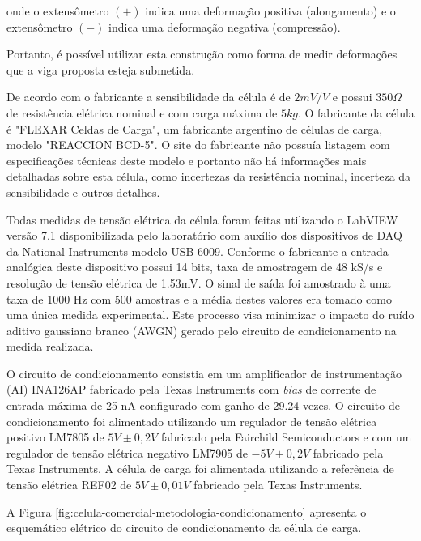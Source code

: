 \documentclass[a4paper]{instrumentacao}
\begin{document}
\noindent onde o extensômetro $(+)$ indica uma deformação positiva (alongamento) e o extensômetro $(-)$ indica uma deformação negativa (compressão).

Portanto, é possível utilizar esta construção como forma de medir deformações que a viga proposta esteja submetida.

De acordo com o fabricante a sensibilidade da célula é de $2 mV/V$ e possui $350 \Omega$ de resistência elétrica nominal e com carga máxima de $5 kg$.  O fabricante da célula é "FLEXAR Celdas de Carga", um fabricante argentino de células de carga, modelo "REACCION BCD-5". O site do fabricante não possuía listagem com especificações técnicas deste modelo e portanto não há informações mais detalhadas sobre esta célula, como incertezas da resistência nominal, incerteza da sensibilidade e outros detalhes.

Todas medidas de tensão elétrica da célula foram feitas utilizando o LabVIEW versão 7.1 disponibilizada pelo laboratório com auxílio dos dispositivos de DAQ da National Instruments modelo USB-6009. Conforme o fabricante \cite{daq-specifications} a entrada analógica deste dispositivo possui 14 bits, taxa de amostragem de 48 kS/s e resolução de tensão elétrica de 1.53mV. O sinal de saída foi amostrado à uma taxa de 1000 Hz com 500 amostras e a média destes valores era tomado como uma única medida experimental. Este processo visa minimizar o impacto do ruído aditivo gaussiano branco (AWGN) gerado pelo circuito de condicionamento na medida realizada.

O circuito de condicionamento consistia em um amplificador de instrumentação (AI) INA126AP fabricado pela Texas Instruments com \textit{bias} de corrente de entrada máxima de 25 nA \cite{datasheet-ina126} configurado com ganho de 29.24 vezes. O circuito de condicionamento foi alimentado utilizando um regulador de tensão elétrica positivo LM7805 de $5V \pm 0,2V$ \cite{datasheet-lm7805} fabricado pela Fairchild Semiconductors e com um regulador de tensão elétrica negativo LM7905 de $-5V \pm 0,2V$ \cite{datasheet-lm7905} fabricado pela Texas Instruments. A célula de carga foi alimentada utilizando a referência de tensão elétrica REF02 de $5V \pm 0,01V$ \cite{datasheet-ref02} fabricado pela Texas Instruments.

A Figura \ref{fig:celula-comercial-metodologia-condicionamento} apresenta o esquemático elétrico do circuito de condicionamento da célula de carga.
\end{document}
